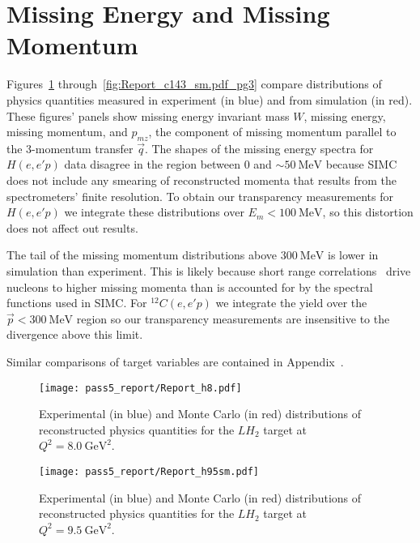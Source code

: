\section{Missing Energy and Missing Momentum}

Figures~\ref{fig:Report_h8.pdf_pg3} through~\ref{fig:Report_c143_sm.pdf_pg3}
compare distributions of physics quantities measured in experiment (in blue)
and from simulation (in red).
These figures' panels show missing energy invariant mass $W$, missing energy,
missing momentum, and $p_{mz}$, the component of missing momentum parallel to
the 3-momentum transfer $\vec{q}$.
The shapes of the missing energy spectra for $H(e,e'p)$ data disagree in the
region between 0 and $\sim\SI{50}{\mega\electronvolt}$
because SIMC does not include any smearing of reconstructed momenta that
results from the spectrometers' finite resolution.
To obtain our transparency measurements for $H(e,e'p)$ we integrate these
distributions over $E_{m}<\SI{100}{\mega\electronvolt}$, so this distortion
does not affect out results.

The tail of the missing momentum distributions above
$\SI{300}{\mega\electronvolt}$ is lower in simulation than experiment.
This is likely because short range correlations~\cite{Fomin_2017}
drive nucleons to higher missing momenta than is accounted for by the
spectral functions used in SIMC.
For ${}^{12}C(e,e'p)$ we integrate the yield over the
$\vec{p}<\SI{300}{\mega\electronvolt}$ region so
our transparency measurements are insensitive to the
divergence above this limit.


Similar comparisons of target variables are contained in
Appendix~\label{app:distributions}.


\begin{figure}[!h]
    \centering
    \texttt{[image: pass5\_report/Report\_h8.pdf]}
    \caption{
            Experimental (in blue) and Monte Carlo (in red) distributions of
            reconstructed physics quantities for
            the $LH_2$ target at $Q^2=\SI{8.0}{\giga\electronvolt\squared}$.
            }
    \label{fig:Report_h8.pdf_pg3}
\end{figure}


\begin{figure}[!h]
    \centering
    \texttt{[image: pass5\_report/Report\_h95sm.pdf]}
    \caption{
            Experimental (in blue) and Monte Carlo (in red) distributions of
            reconstructed physics quantities for
            the $LH_2$ target at $Q^2=\SI{9.5}{\giga\electronvolt\squared}$.
            }
    \label{fig:Report_h95sm.pdf_pg3}
\end{figure}


